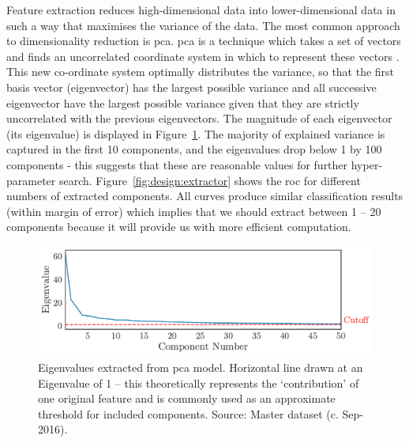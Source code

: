 \documentclass[../thesis/thesis.tex]{subfiles}
\begin{document}
Feature extraction reduces high-dimensional data into lower-dimensional data in such a way that maximises the variance of the data. The most common approach to dimensionality reduction is \gls{pca}. \Gls{pca} is a technique which takes a set of vectors and finds an uncorrelated coordinate system in which to represent these vectors \cite{jolliffe2002}. This new co-ordinate system optimally distributes the variance, so that the first basis vector (eigenvector) has the largest possible variance and all successive eigenvector have the largest possible variance given that they are strictly uncorrelated with the previous eigenvectors. The magnitude of each eigenvector (its eigenvalue) is displayed in Figure~\ref{fig:design:scree_plot}. The majority of explained variance is captured in the first 10 components, and the eigenvalues drop below 1 by 100 components - this suggests that these are reasonable values for further hyper-parameter search. Figure~\ref{fig:design:extractor} shows the \gls{roc} for different numbers of extracted components. All curves produce similar classification results (within margin of error) which implies that we should extract between 1 -- 20 components because it will provide us with more efficient computation.

\begin{figure}[!htb]
    \centering
    \includegraphics[width=\textwidth]{../figures/design/distribution_eigenvalues}
    \caption[PCA scree plot]{Eigenvalues extracted from \gls{pca} model. Horizontal line drawn at an Eigenvalue of 1 -- this theoretically represents the `contribution' of one original feature and is commonly used as an approximate threshold for included components. Source: Master dataset (c. Sep-2016).}
    \label{fig:design:scree_plot}
\end{figure}
\end{document}
